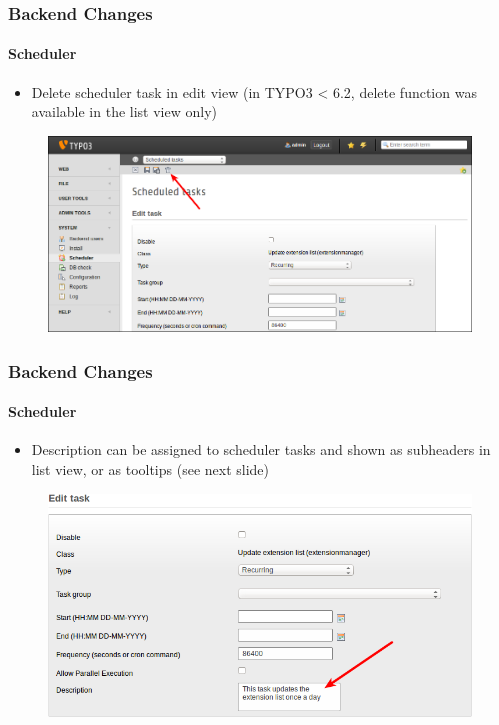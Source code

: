 
\begin{frame}[fragile]
	\frametitle{Backend Changes}
	\framesubtitle{Scheduler}

	\begin{itemize}
		\item Delete scheduler task in edit view\newline
			\small(in TYPO3 < 6.2, delete function was available in the list view only)\normalsize
	\end{itemize}

	\begin{figure}
		\includegraphics[width=0.95\linewidth]{Images/BackendChanges/DeleteSchedulerTaskInEditView.png}
	\end{figure}

\end{frame}


\begin{frame}[fragile]
	\frametitle{Backend Changes}
	\framesubtitle{Scheduler}

	\begin{itemize}
		\item Description can be assigned to scheduler tasks and shown as subheaders in list view, or as tooltips (see next slide)
	\end{itemize}

	\begin{figure}
		\includegraphics[width=0.7\linewidth]{Images/BackendChanges/SchedulerTaskDescription.png}
	\end{figure}

\end{frame}

